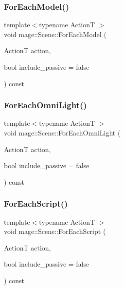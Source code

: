 \hypertarget{classmage_1_1_scene_a6df0662b829691415f50ea1d45341582}{}\label{classmage_1_1_scene_a6df0662b829691415f50ea1d45341582} 
\subsubsection{\texorpdfstring{For\+Each\+Model()}{ForEachModel()}}
{\footnotesize\ttfamily template$<$typename ActionT $>$ \\
void mage\+::\+Scene\+::\+For\+Each\+Model (\begin{DoxyParamCaption}\item[{ActionT}]{action,  }\item[{bool}]{include\+\_\+passive = {\ttfamily false} }\end{DoxyParamCaption}) const}

\hypertarget{classmage_1_1_scene_a9dae59b09d5167d027fc4cf8f09b961c}{}\label{classmage_1_1_scene_a9dae59b09d5167d027fc4cf8f09b961c} 
\subsubsection{\texorpdfstring{For\+Each\+Omni\+Light()}{ForEachOmniLight()}}
{\footnotesize\ttfamily template$<$typename ActionT $>$ \\
void mage\+::\+Scene\+::\+For\+Each\+Omni\+Light (\begin{DoxyParamCaption}\item[{ActionT}]{action,  }\item[{bool}]{include\+\_\+passive = {\ttfamily false} }\end{DoxyParamCaption}) const}

\hypertarget{classmage_1_1_scene_a217ee5824ebed8465c91706ef551edcc}{}\label{classmage_1_1_scene_a217ee5824ebed8465c91706ef551edcc} 
\subsubsection{\texorpdfstring{For\+Each\+Script()}{ForEachScript()}}
{\footnotesize\ttfamily template$<$typename ActionT $>$ \\
void mage\+::\+Scene\+::\+For\+Each\+Script (\begin{DoxyParamCaption}\item[{ActionT}]{action,  }\item[{bool}]{include\+\_\+passive = {\ttfamily false} }\end{DoxyParamCaption}) const}

